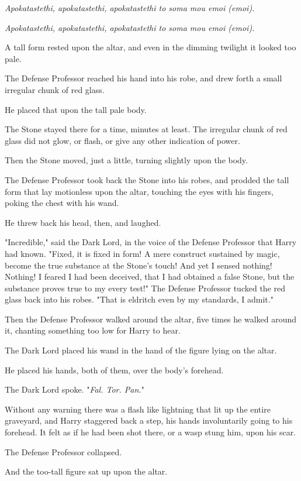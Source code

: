 \emph{Apokatastethi, apokatastethi, apokatastethi to soma mou emoi (emoi).}

\emph{Apokatastethi, apokatastethi, apokatastethi to soma mou emoi (emoi).}

A tall form rested upon the altar, and even in the dimming twilight it looked
too pale.

The Defense Professor reached his hand into his robe, and drew forth a small
irregular chunk of red glass.

He placed that upon the tall pale body.

The Stone stayed there for a time, minutes at least. The irregular chunk of red
glass did not glow, or flash, or give any other indication of power.

Then the Stone moved, just a little, turning slightly upon the body.

The Defense Professor took back the Stone into his robes, and prodded the tall
form that lay motionless upon the altar, touching the eyes with his fingers,
poking the chest with his wand.

He threw back his head, then, and laughed.

"Incredible," said the Dark Lord, in the voice of the Defense Professor that
Harry had known. "Fixed, it is fixed in form! A mere construct sustained by
magic, become the true substance at the Stone's touch! And yet I sensed
nothing! Nothing! I feared I had been deceived, that I had obtained a false
Stone, but the substance proves true to my every test!" The Defense Professor
tucked the red glass back into his robes. "That is eldritch even by my
standards, I admit."

Then the Defense Professor walked around the altar, five times he walked around
it, chanting something too low for Harry to hear.

The Dark Lord placed his wand in the hand of the figure lying on the altar.

He placed his hands, both of them, over the body's forehead.

The Dark Lord spoke. "\emph{Fal. Tor. Pan.}"

Without any warning there was a flash like lightning that lit up the entire
graveyard, and Harry staggered back a step, his hands involuntarily going to
his forehead. It felt as if he had been shot there, or a wasp stung him, upon
his scar.

The Defense Professor collapsed.

And the too-tall figure sat up upon the altar.

